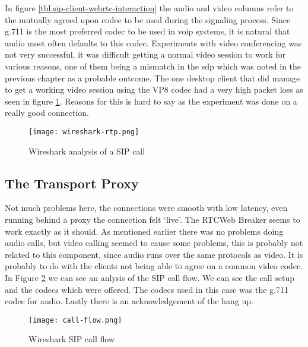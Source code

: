 In figure \ref{tbl:sip-client-webrtc-interaction} the audio and video columns refer to the mutually agreed upon codec to be used during the signaling process. Since g.711 is the most preferred codec to be used in \gls{voip} systems, it is natural that audio most often defaults to this codec. Experiments with video conferencing was not very successful, it was difficult getting a normal video session to work for various reasons, one of them being a mismatch in the \gls{sdp} which was noted in the previous chapter as a probable outcome. The one desktop client that did manage to get a working video session using the VP8 codec had a very high packet loss as seen in figure \ref{fig:wireshark-sip-call}. Reasons for this is hard to say as the experiment was done on a really good connection.

\begin{figure}[here]
\centerline{\texttt{[image: wireshark-rtp.png]}}
\caption{Wireshark analysis of a SIP call}
\label{fig:wireshark-sip-call}
\end{figure}

\subsection{The Transport Proxy}
Not much problems here, the connections were smooth with low latency, even running behind a proxy the connection felt `live'. The RTCWeb Breaker seems to work exactly as it should. As mentioned earlier there was no problems doing audio calls, but video calling seemed to cause some problems, this is probably not related to this component, since audio runs over the same protocols as video. It is probably to do with the clients not being able to agree on a common video codec. In Figure \ref{fig:wireshark-sip-call-flow} we can see an anlysis of the SIP call flow. We can see the call setup and the codecs which were offered. The codecs used in this case was the g.711 codec for audio. Lastly there is an acknowledgement of the hang up.

\begin{figure}[here]
\centerline{\texttt{[image: call-flow.png]}}
\caption{Wireshark SIP call flow}
\label{fig:wireshark-sip-call-flow}
\end{figure}

